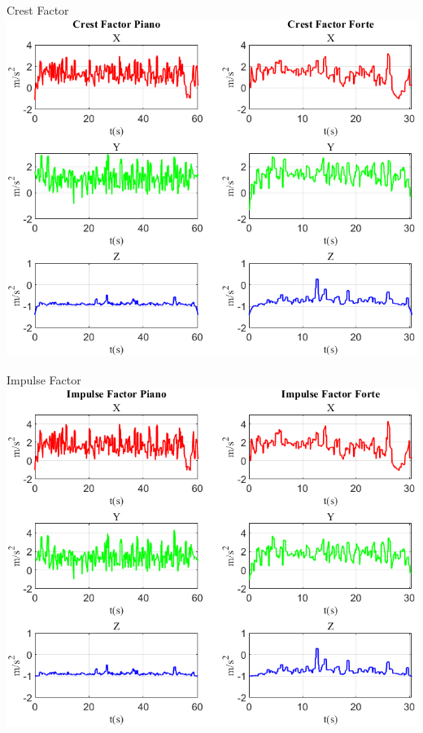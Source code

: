\documentclass[beamer]{standalone}
\begin{document}
		\begin{frame}{{Crest Factor}}
				\centering\includegraphics[height=.8\textheight]{figure/Acc/Crest Factor}
			\end{frame}
	
		\begin{frame}{{Impulse Factor}}
				\centering\includegraphics[height=.8\textheight]{figure/Acc/Impulse Factor}
			\end{frame}
	
\end{document}
